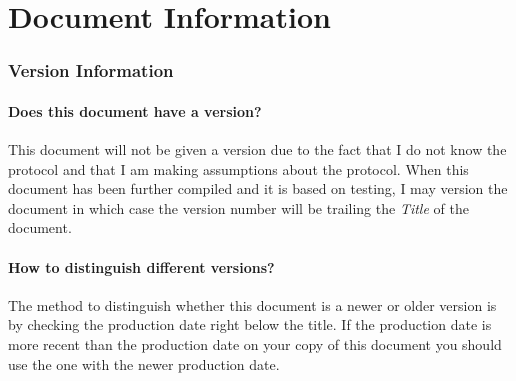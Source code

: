 %
%

%
%



\part{Document Information}

\section{Version Information}

    \subsection{Does this document have a version?}
    
    This document will not be given a version due to the fact that I do not know the
    protocol and that I am making assumptions about the protocol. When this
    document has been further compiled and it is based on testing, I may
    version the document in which case the version number will be trailing the
    \emph{Title} of the document.

    \subsection{How to distinguish different versions?}

    The method to distinguish whether this document is a newer or
    older version is by checking the production date right below the title.
    If the production date is more recent than the production date on your
    copy of this document you should use the one with the newer production
    date.

